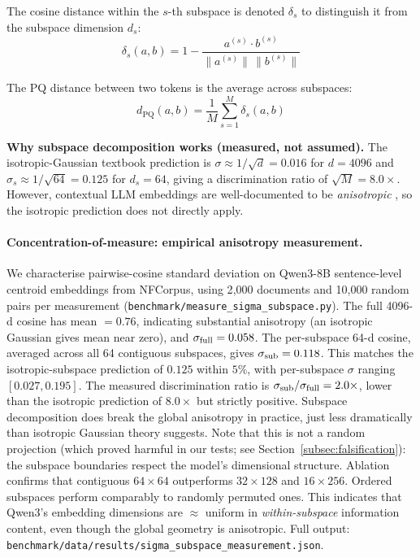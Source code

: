 \documentclass[review,1p]{elsarticle}
\begin{document}
The cosine distance within the $s$-th subspace is denoted $\delta_s$ to distinguish it from the subspace dimension $d_s$:
\begin{equation}
\label{eq:subspace-dist}
\delta_s(a, b) = 1 - \frac{a^{(s)} \cdot b^{(s)}}{\|a^{(s)}\| \, \|b^{(s)}\|}
\end{equation}

The PQ distance between two tokens is the average across subspaces:
\begin{equation}
\label{eq:pq-dist}
d_{\mathrm{PQ}}(a, b) = \frac{1}{M} \sum_{s=1}^{M} \delta_s(a, b)
\end{equation}

\textbf{Why subspace decomposition works (measured, not assumed).} The isotropic-Gaussian textbook prediction is $\sigma \approx 1/\sqrt{d} = 0.016$ for $d=4096$ and $\sigma_s \approx 1/\sqrt{64} = 0.125$ for $d_s=64$, giving a discrimination ratio of $\sqrt{M} = 8.0\times$. However, contextual LLM embeddings are well-documented to be \emph{anisotropic} \citep{ethayarajh2019contextual,cai2021isotropy}, so the isotropic prediction does not directly apply.

\paragraph{Concentration-of-measure: empirical anisotropy measurement.}\label{subsec:concentration-measurement} We characterise pairwise-cosine standard deviation on Qwen3-8B sentence-level centroid embeddings from NFCorpus, using 2{,}000 documents and 10{,}000 random pairs per measurement (\texttt{benchmark/measure\_sigma\_subspace.py}). The full 4096-d cosine has mean $= 0.76$, indicating substantial anisotropy (an isotropic Gaussian gives mean near zero), and $\sigma_{\rm full} = 0.058$. The per-subspace 64-d cosine, averaged across all 64 contiguous subspaces, gives $\sigma_{\rm sub} = 0.118$. This matches the isotropic-subspace prediction of $0.125$ within $5\%$, with per-subspace $\sigma$ ranging $[0.027, 0.195]$. The measured discrimination ratio is $\sigma_{\rm sub}/\sigma_{\rm full} = 2.0\times$, lower than the isotropic prediction of $8.0\times$ but strictly positive. Subspace decomposition does break the global anisotropy in practice, just less dramatically than isotropic Gaussian theory suggests. Note that this is not a random projection (which proved harmful in our tests; see Section~\ref{subsec:falsification}): the subspace boundaries respect the model's dimensional structure. Ablation confirms that contiguous $64 \times 64$ outperforms $32 \times 128$ and $16 \times 256$. Ordered subspaces perform comparably to randomly permuted ones. This indicates that Qwen3's embedding dimensions are $\approx$ uniform in \emph{within-subspace} information content, even though the global geometry is anisotropic. Full output: \texttt{benchmark/data/results/sigma\_subspace\_measurement.json}.
\end{document}
